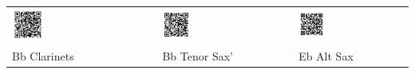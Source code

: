 \begin{tabular}{p{} p{} p{}  p{} p{}}
  \includegraphics[width=0.25\textwidth]{QR_Codes/QR_Yorkers_Bb_Clar.png}
  &
  &
  \includegraphics[width=0.25\textwidth]{QR_Codes/QR_Yorkers_Bb_TenSax.png}
  &
  &
  \includegraphics[width=0.25\textwidth]{QR_Codes/QR_Yorkers_Eb.png}\\                                                     
   Bb Clarinets
   &
   &
   Bb Tenor Sax'
   &
   &
   Eb Alt Sax\\
\end{tabular}